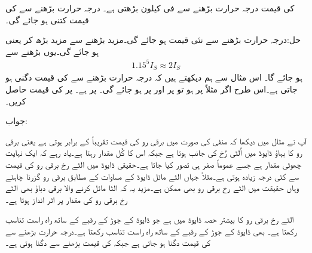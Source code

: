 کی قیمت درجہ حرارت بڑھنے سے   فی کیلون بڑھتی ہے۔ درجہ حرارت بڑھنے سے  کی قیمت کتنی ہو جائے گی۔

حل:درجہ حرارت  بڑھنے سے نئی قیمت  ہو جائے گی۔مزید  بڑھنے سے   مزید  بڑھ کر  یعنی  ہو جائے گی۔یوں  بڑھنے سے
\begin{align*}
1.15^5 I_S \approx 2 I_S
\end{align*} 
ہو جائے گا۔
اس مثال سے ہم دیکھتے ہیں کہ درجہ حرارت  بڑھنے سے  کی قیمت دگنی ہو جاتی ہے۔اس طرح اگر مثلاً  پر  ہو تو  پر  اور  پر  ہو جائے گی۔
 پر   ہے۔  پر  کی قیمت حاصل کریں۔

جواب:

آپ نے مثال  میں دیکھا کہ منفی  کی صورت میں برقی رو کی قیمت   تقریباً  کے برابر ہوتی ہے یعنی برقی رو کا بہاؤ ڈایوڈ میں اُلٹی رُخ کی جانب ہوتا ہے جبکہ اس کا کُل مقدار  رہتا ہے۔یاد رہے کہ  ایک نہایت چھوٹی مقدار ہے جسے عموماً صفر ہی تصور کیا جاتا ہے۔حقیقی ڈایوڈ میں الٹے رخ برقی رو کی قیمت   سے کئی درجہ زیادہ ہوتی ہے۔مثلاً جہاں الٹے مائل ڈایوڈ کے مساوات کے مطابق  برقی رو گزرنا چاہئے وہاں حقیقت میں الٹے رخ  برقی رو بھی ممکن ہے۔مزید یہ کہ الٹا مائل کرنے والا برقی دباؤ بھی الٹے رخ برقی رو کی مقدار  پر اثر انداز ہوتا ہے۔

الٹے رخ برقی رو کا بیشتر حصہ ڈایوڈ میں   ہے جو ڈایوڈ کے  جوڑ کے رقبے کے ساتھ راہ راست تناسب رکھتا ہے۔ بھی ڈایوڈ کے  جوڑ کے رقبے کے ساتھ راہ راست تناسب رکھتا  ہے۔درجہ حرارت  بڑھنے سے کی قیمت دگنا ہو جاتی ہے جبکہ   کی قیمت   بڑھنے سے دگنا ہوتی ہے۔


